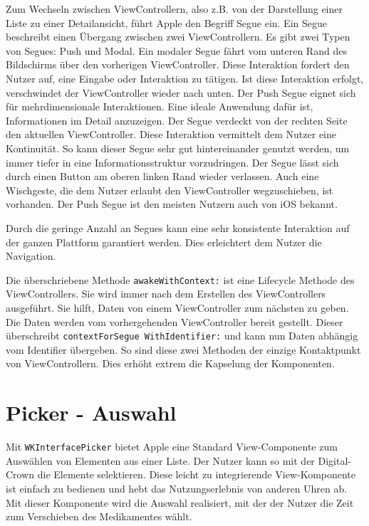Zum Wechseln zwischen ViewControllern, also z.B. von der Darstellung einer Liste zu einer Detailansicht, führt Apple den Begriff Segue ein. Ein Segue beschreibt einen Übergang zwischen zwei ViewControllern. Es gibt zwei Typen von Segues: Push und Modal. Ein modaler Segue fährt vom unteren Rand des Bildschirms über den vorherigen ViewController. Diese Interaktion fordert den Nutzer auf, eine Eingabe oder Interaktion zu tätigen. Ist diese Interaktion erfolgt, verschwindet der ViewController wieder nach unten. Der Push Segue eignet sich für mehrdimensionale Interaktionen. Eine ideale Anwendung dafür ist, Informationen im Detail anzuzeigen. Der Segue verdeckt von der rechten Seite  den aktuellen ViewController. Diese Interaktion vermittelt dem Nutzer eine Kontinuität. So kann dieser Segue sehr gut hintereinander genutzt werden, um immer tiefer in eine Informationsstruktur vorzudringen. Der Segue lässt sich durch einen Button am oberen linken Rand wieder verlassen. Auch eine Wischgeste, die dem Nutzer erlaubt den ViewController wegzuschieben, ist vorhanden. Der Push Segue ist den meisten Nutzern auch von iOS bekannt.

Durch die geringe Anzahl an Segues kann eine sehr konsistente Interaktion auf der ganzen Plattform garantiert werden. Dies erleichtert dem Nutzer die Navigation.

Die überschriebene Methode \lstinline{awakeWithContext:} ist eine Lifecycle Methode des ViewControllers. Sie wird immer nach dem Erstellen des ViewControllers ausgeführt. Sie hilft, Daten von einem ViewController zum nächsten zu geben. Die Daten werden vom vorhergehenden ViewController bereit gestellt. Dieser überschreibt \lstinline{contextForSegue WithIdentifier:} und kann nun Daten abhängig vom Identifier übergeben. So sind diese zwei Methoden der einzige Kontaktpunkt von ViewControllern. Dies erhöht extrem die Kapselung der Komponenten.



\section{Picker - Auswahl}
Mit \lstinline{WKInterfacePicker} bietet Apple eine Standard View-Componente zum Auswählen von Elementen aus einer Liste. Der Nutzer kann so mit der Digital-Crown die Elemente selektieren. Diese leicht zu integrierende View-Komponente ist einfach zu bedienen und hebt das Nutzungserlebnis von anderen Uhren ab. Mit dieser Komponente wird die Auswahl realisiert, mit der der Nutzer die Zeit zum Verschieben des Medikamentes wählt.

